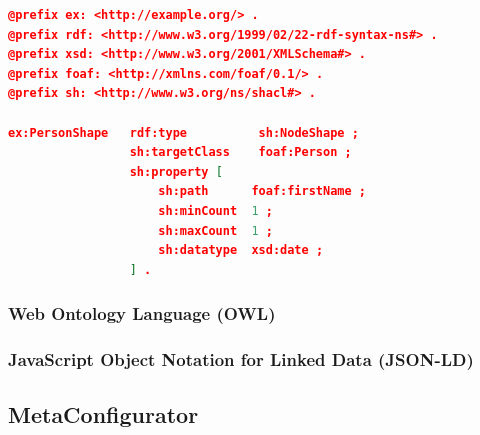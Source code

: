 \begin{lstlisting}[language=json,basicstyle=\scriptsize,firstnumber=1,caption={SHACL example shape},captionpos=b,label={lst:shacl_example}]
@prefix ex: <http://example.org/> .
@prefix rdf: <http://www.w3.org/1999/02/22-rdf-syntax-ns#> .
@prefix xsd: <http://www.w3.org/2001/XMLSchema#> .
@prefix foaf: <http://xmlns.com/foaf/0.1/> .
@prefix sh: <http://www.w3.org/ns/shacl#> .

ex:PersonShape   rdf:type          sh:NodeShape ;
                 sh:targetClass    foaf:Person ;
                 sh:property [
                     sh:path      foaf:firstName ;
                     sh:minCount  1 ;
                     sh:maxCount  1 ;
                     sh:datatype  xsd:date ;
                 ] .
\end{lstlisting}



\subsubsection{Web Ontology Language (OWL)}



\subsubsection{JavaScript Object Notation for Linked Data (JSON-LD)}



\subsection{MetaConfigurator}